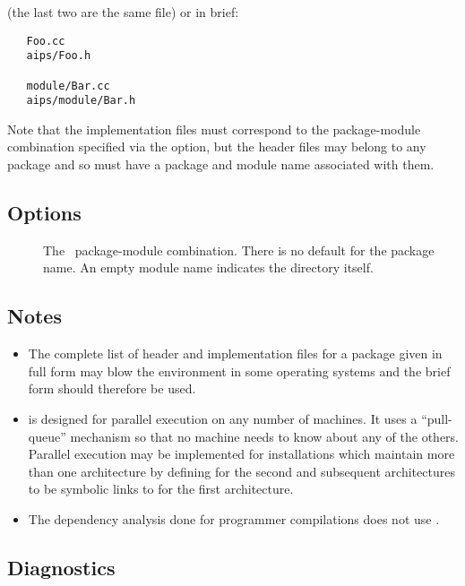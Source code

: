 \noindent
(the last two are the same file) or in brief:

\begin{verbatim}
   Foo.cc
   aips/Foo.h

   module/Bar.cc
   aips/module/Bar.h
\end{verbatim}

\noindent
Note that the implementation files must correspond to the package-module
combination specified via the  option, but the header files may belong
to any package and so must have a package and module name associated with
them.

\subsection*{Options}

\begin{description}
\item[]
   The \aipspp\ package-module combination.  There is no default for the
   package name.  An empty module name indicates the 
   directory itself.
\end{description}

\subsection*{Notes}

\begin{itemize}
\item
   The complete list of header and implementation files for a package given in
   full form may blow the environment in some operating systems and the brief
   form should therefore be used.

\item
    is designed for parallel execution on any number of machines.
   It uses a ``pull-queue'' mechanism so that no machine needs to know about
   any of the others.  Parallel execution may be implemented for installations
   which maintain more than one architecture by defining  for
   the second and subsequent architectures to be symbolic links to
    for the first architecture.

\item
   The dependency analysis done for programmer compilations does not use
   .
\end{itemize}

\subsection*{Diagnostics}


